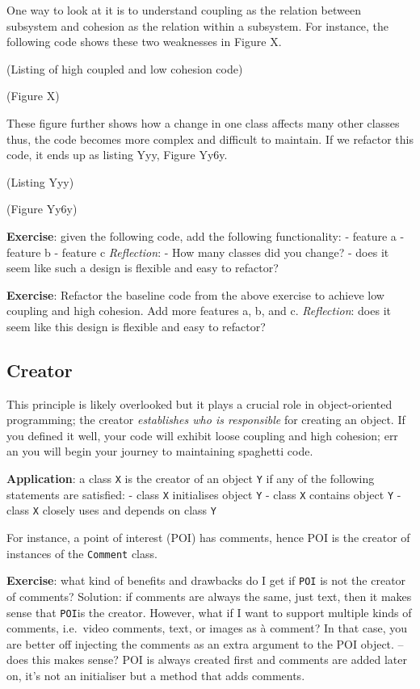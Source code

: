\documentclass[]{article}
\begin{document}
One way to look at it is to understand coupling as the relation between
subsystem and cohesion as the relation within a subsystem. For instance,
the following code shows these two weaknesses in Figure X.

(Listing of high coupled and low cohesion code)

(Figure X)

These figure further shows how a change in one class affects many other
classes thus, the code becomes more complex and difficult to maintain.
If we refactor this code, it ends up as listing Yyy, Figure Yy6y.

(Listing Yyy)

(Figure Yy6y)

\textbf{Exercise}: given the following code, add the following
functionality: - feature a - feature b - feature c \emph{Reflection}: -
How many classes did you change? - does it seem like such a design is
flexible and easy to refactor?

\textbf{Exercise}: Refactor the baseline code from the above exercise to
achieve low coupling and high cohesion. Add more features a, b, and c.
\emph{Reflection}: does it seem like this design is flexible and easy to
refactor?

\subsection{Creator}\label{creator}

This principle is likely overlooked but it plays a crucial role in
object-oriented programming; the creator \emph{establishes who is
responsible} for creating an object. If you defined it well, your code
will exhibit loose coupling and high cohesion; err an you will begin
your journey to maintaining spaghetti code.

\textbf{Application}: a class \texttt{X} is the creator of an object
\texttt{Y} if any of the following statements are satisfied: - class
\texttt{X} initialises object \texttt{Y} - class \texttt{X} contains
object \texttt{Y} - class \texttt{X} closely uses and depends on class
\texttt{Y}

For instance, a point of interest (POI) has comments, hence POI is the
creator of instances of the \texttt{Comment} class.

\textbf{Exercise}: what kind of benefits and drawbacks do I get if
\texttt{POI} is not the creator of comments? Solution: if comments are
always the same, just text, then it makes sense that \texttt{POI}is the
creator. However, what if I want to support multiple kinds of comments,
i.e.~video comments, text, or images as à comment? In that case, you are
better off injecting the comments as an extra argument to the POI
object. -- does this makes sense? POI is always created first and
comments are added later on, it's not an initialiser but a method that
adds comments.
\end{document}
